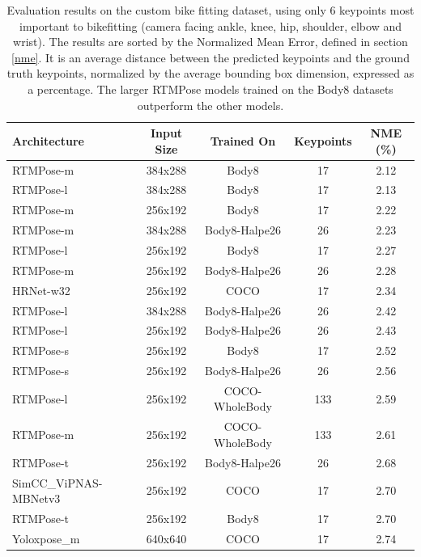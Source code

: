 \begin{table}[htbp]
    \begin{tabular}{l cccc}
        \toprule
        Architecture          & Input Size & Trained On     & Keypoints & NME (\%) \\
        \midrule
        RTMPose-m             & 384x288    & Body8          & 17        & 2.12     \\
        RTMPose-l             & 384x288    & Body8          & 17        & 2.13     \\
        RTMPose-m             & 256x192    & Body8          & 17        & 2.22     \\
        RTMPose-m             & 384x288    & Body8-Halpe26  & 26        & 2.23     \\
        RTMPose-l             & 256x192    & Body8          & 17        & 2.27     \\
        RTMPose-m             & 256x192    & Body8-Halpe26  & 26        & 2.28     \\
        HRNet-w32             & 256x192    & COCO           & 17        & 2.34     \\
        RTMPose-l             & 384x288    & Body8-Halpe26  & 26        & 2.42     \\
        RTMPose-l             & 256x192    & Body8-Halpe26  & 26        & 2.43     \\
        RTMPose-s             & 256x192    & Body8          & 17        & 2.52     \\
        RTMPose-s             & 256x192    & Body8-Halpe26  & 26        & 2.56     \\
        RTMPose-l             & 256x192    & COCO-WholeBody & 133       & 2.59     \\
        RTMPose-m             & 256x192    & COCO-WholeBody & 133       & 2.61     \\
        RTMPose-t             & 256x192    & Body8-Halpe26  & 26        & 2.68     \\
        SimCC\_ViPNAS-MBNetv3 & 256x192    & COCO           & 17        & 2.70     \\
        RTMPose-t             & 256x192    & Body8          & 17        & 2.70     \\
        Yoloxpose\_m          & 640x640    & COCO           & 17        & 2.74     \\
        \bottomrule
    \end{tabular}
    \caption{Evaluation results on the custom bike fitting dataset, using only 6 keypoints most important to bikefitting (camera facing ankle, knee, hip, shoulder, elbow and wrist). The results are sorted by the Normalized Mean Error, defined in section \ref{nme}. It is an average distance between the predicted keypoints and the ground truth keypoints, normalized by the average bounding box dimension, expressed as a percentage. The larger RTMPose models trained on the Body8 datasets outperform the other models.}
    \label{tab:evaluation_results_all}

\end{table}


